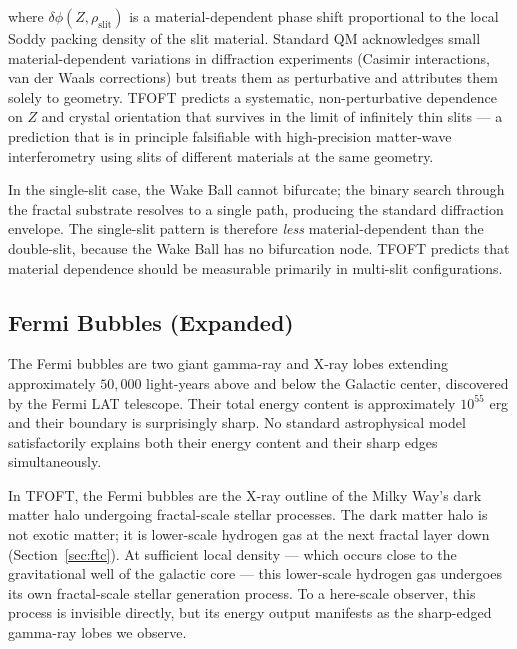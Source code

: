   where $\delta\phi(Z, \rho_{\text{slit}})$ is a material-dependent phase shift
  proportional to the local Soddy packing density of the slit material. Standard
  QM acknowledges small material-dependent variations in diffraction experiments
  (Casimir interactions, van der Waals corrections) but treats them as perturbative
  and attributes them solely to geometry. TFOFT predicts a systematic, non-perturbative
  dependence on $Z$ and crystal orientation that survives in the limit of infinitely
  thin slits --- a prediction that is in principle falsifiable with high-precision
  matter-wave interferometry using slits of different materials at the same geometry.

  In the single-slit case, the Wake Ball cannot bifurcate; the binary search
  through the fractal substrate resolves to a single path, producing the standard
  diffraction envelope. The single-slit pattern is therefore \emph{less}
  material-dependent than the double-slit, because the Wake Ball has no bifurcation
  node. TFOFT predicts that material dependence should be measurable primarily
  in multi-slit configurations.



\subsection*{Fermi Bubbles (Expanded)}

  The Fermi bubbles are two giant gamma-ray and X-ray lobes extending approximately
  $50,000$ light-years above and below the Galactic center, discovered by the Fermi
  LAT telescope. Their total energy content is approximately $10^{55}$ erg and their
  boundary is surprisingly sharp. No standard astrophysical model satisfactorily
  explains both their energy content and their sharp edges simultaneously.

  In TFOFT, the Fermi bubbles are the X-ray outline of the Milky Way's dark matter
  halo undergoing fractal-scale stellar processes. The dark matter halo is not
  exotic matter; it is lower-scale hydrogen gas at the next fractal layer down
  (Section~\ref{sec:ftc}). At sufficient local density --- which occurs close to
  the gravitational well of the galactic core --- this lower-scale hydrogen gas
  undergoes its own fractal-scale stellar generation process. To a here-scale
  observer, this process is invisible directly, but its energy output manifests
  as the sharp-edged gamma-ray lobes we observe.

